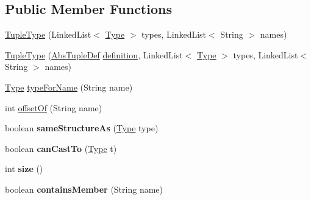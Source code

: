 \subsection*{Public Member Functions}
\begin{DoxyCompactItemize}
\item 
\hyperlink{classcompiler_1_1seman_1_1type_1_1_tuple_type_a61612bd28ef2f393b303123e02d9ffcd}{Tuple\+Type} (Linked\+List$<$ \hyperlink{classcompiler_1_1seman_1_1type_1_1_type}{Type} $>$ types, Linked\+List$<$ String $>$ names)
\item 
\hyperlink{classcompiler_1_1seman_1_1type_1_1_tuple_type_af3bcf631a3f347efcc49824553aef272}{Tuple\+Type} (\hyperlink{classcompiler_1_1abstr_1_1tree_1_1def_1_1_abs_tuple_def}{Abs\+Tuple\+Def} \hyperlink{classcompiler_1_1seman_1_1type_1_1_tuple_type_a459e333d721e5853a0394cd9778b41f4}{definition}, Linked\+List$<$ \hyperlink{classcompiler_1_1seman_1_1type_1_1_type}{Type} $>$ types, Linked\+List$<$ String $>$ names)
\item 
\hyperlink{classcompiler_1_1seman_1_1type_1_1_type}{Type} \hyperlink{classcompiler_1_1seman_1_1type_1_1_tuple_type_ab593e1e75bfbdc89f45736bf07baa2f8}{type\+For\+Name} (String name)
\item 
int \hyperlink{classcompiler_1_1seman_1_1type_1_1_tuple_type_a0c128bac1ebab80026b676f96c1c7d3d}{offset\+Of} (String name)
\item 
\mbox{\label{classcompiler_1_1seman_1_1type_1_1_tuple_type_abac7a15f2ceaafcd0759e529cf260d8b}} 
boolean {\bfseries same\+Structure\+As} (\hyperlink{classcompiler_1_1seman_1_1type_1_1_type}{Type} type)
\item 
\mbox{\label{classcompiler_1_1seman_1_1type_1_1_tuple_type_ae83af992a867b8816305de655085990b}} 
boolean {\bfseries can\+Cast\+To} (\hyperlink{classcompiler_1_1seman_1_1type_1_1_type}{Type} t)
\item 
\mbox{\label{classcompiler_1_1seman_1_1type_1_1_tuple_type_ab106cf3c5ced2c0ddff9ac1959fc052b}} 
int {\bfseries size} ()
\item 
\mbox{\label{classcompiler_1_1seman_1_1type_1_1_tuple_type_a9f00572d937763283d2fe4ecd5aa13ae}} 
boolean {\bfseries contains\+Member} (String name)

\end{DoxyCompactItemize}
